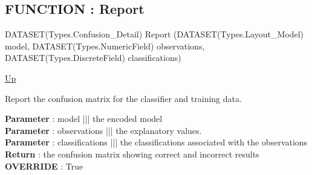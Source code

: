 \subsection*{FUNCTION : Report}
\hypertarget{ecldoc:logisticregression.binomiallogisticregression.report}{}
\begin{minipage}[t]{\textwidth}
\begin{flushleft}
DATASET(Types.Confusion\_Detail) Report (DATASET(Types.Layout\_Model) model, DATASET(Types.NumericField) observations, DATASET(Types.DiscreteField) classifications)
\end{flushleft}
\end{minipage}
\hyperlink{ecldoc:logisticregression.binomiallogisticregression}{Up}

\par
Report the confusion matrix for the classifier and training data.
\par
\textbf{Parameter} : model ||| the encoded model \\
\textbf{Parameter} : observations ||| the explanatory values. \\
\textbf{Parameter} : classifications ||| the classifications associated with the observations \\
\textbf{Return} : the confusion matrix showing correct and incorrect results \\
\textbf{OVERRIDE} : True \\

